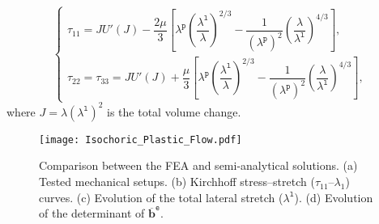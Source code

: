 \documentclass[preprint,11pt]{elsarticle}
\theoremstyle{definition}
\begin{document}
\begin{equation*}
    \left\{ \begin{array}{l}
        \tau_{11} = J U'(J) - \dfrac{2\mu}{3} \left[ \lambda^\texttt{p} \left( \dfrac{\lambda^\texttt{l}}{\lambda} \right)^{2/3} - \dfrac{1}{(\lambda^\texttt{p})^2} \left( \dfrac{\lambda}{\lambda^\texttt{l}} \right)^{4/3} \right], \\[12pt]
        \tau_{22} = \tau_{33} = J U'(J) + \dfrac{\mu}{3} \left[ \lambda^\texttt{p} \left( \dfrac{\lambda^\texttt{l}}{\lambda} \right)^{2/3} - \dfrac{1}{(\lambda^\texttt{p})^2} \left( \dfrac{\lambda}{\lambda^\texttt{l}} \right)^{4/3}\right],
    \end{array} \right.
\end{equation*}
where $J = \lambda (\lambda^\texttt{l})^2$ is the total volume change. 

\begin{figure}[!htbp]
    \centering
    \texttt{[image: Isochoric\_Plastic\_Flow.pdf]}
    \caption{Comparison between the FEA and semi-analytical solutions. (a) Tested mechanical setups. (b) Kirchhoff stress--stretch ($\tau_{11}$--$\lambda_1$) curves. (c) Evolution of the total lateral stretch ($\lambda^\texttt{l}$). (d) Evolution of the determinant of $\overline{\mathbf{b}}^\texttt{e}$.}
    \label{Fig: Isochoric Plastic Flow}
\end{figure}
\end{document}
